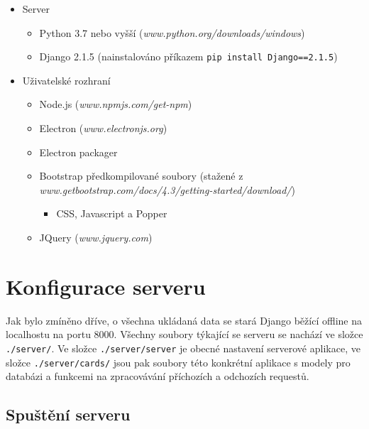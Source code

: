 \documentclass[11pt]{article}
\providecommand{\tightlist}{\setlength{\itemsep}{1pt}\setlength{\parskip}{1pt}}
\let\oldtexttt\texttt
\renewcommand{\texttt}[1]{\oldtexttt{\textcolor{codehighlight}{#1}}}
\begin{document}
\begin{itemize}
\tightlist
\item
  Server

  \begin{itemize}
  \tightlist
  \item
    Python 3.7 nebo vyšší (\emph{www.python.org/downloads/windows})
  \item
    Django 2.1.5 (nainstalováno příkazem
    \texttt{pip\ install\ Django==2.1.5})
  \end{itemize}
\item
  Uživatelské rozhraní

  \begin{itemize}
  \tightlist
  \item
    Node.js (\emph{www.npmjs.com/get-npm})
  \item
    Electron (\emph{www.electronjs.org})
  \item
    Electron packager
  \item
    Bootstrap předkompilované soubory (stažené z
    \emph{www.getbootstrap.com/docs/4.3/getting-started/download/})

    \begin{itemize}
    \tightlist
    \item
      CSS, Javascript a Popper
    \end{itemize}
  \item
    JQuery (\emph{www.jquery.com})
  \end{itemize}
\end{itemize}

\hypertarget{konfigurace-serveru}{%
\section{Konfigurace serveru}\label{konfigurace-serveru}}

Jak bylo zmíněno dříve, o všechna ukládaná data se stará Django běžící
offline na localhostu na portu 8000. Všechny soubory týkající se serveru
se nachází ve složce \texttt{./server/}. Ve složce
\texttt{./server/server} je obecné nastavení serverové aplikace, ve
složce \texttt{./server/cards/} jsou pak soubory této konkrétní aplikace
s modely pro databázi a funkcemi na zpracovávání příchozích a odchozích
requestů.

\hypertarget{spuux161tux11bnuxed-serveru}{%
\subsection{Spuštění serveru}\label{spuux161tux11bnuxed-serveru}}
\end{document}
